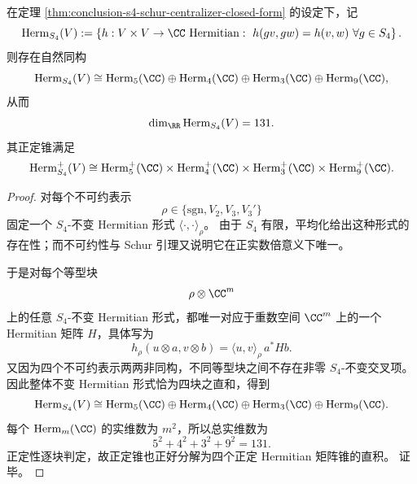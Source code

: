 \begin{proposition}\label{prop:conclusion-s4-invariant-hermitian-cone-product}
在定理 \ref{thm:conclusion-s4-schur-centralizer-closed-form} 的设定下，记
\[
\mathrm{Herm}_{S_4}(V)
:=
\left\{
h:V\times V\to \CC\ \text{Hermitian}:\ 
h(gv,gw)=h(v,w)\ \forall g\in S_4
\right\}.
\]
则存在自然同构
\[
\mathrm{Herm}_{S_4}(V)
\cong
\mathrm{Herm}_5(\CC)\oplus
\mathrm{Herm}_4(\CC)\oplus
\mathrm{Herm}_3(\CC)\oplus
\mathrm{Herm}_9(\CC),
\]
从而
\[
\dim_{\RR}\mathrm{Herm}_{S_4}(V)=131.
\]
其正定锥满足
\[
\mathrm{Herm}_{S_4}^{+}(V)
\cong
\mathrm{Herm}_5^{+}(\CC)\times
\mathrm{Herm}_4^{+}(\CC)\times
\mathrm{Herm}_3^{+}(\CC)\times
\mathrm{Herm}_9^{+}(\CC).
\]
\end{proposition}
\begin{proof}
对每个不可约表示
\[
\rho\in\{\mathrm{sgn},V_2,V_3,V_3'\}
\]
固定一个 \(S_4\)-不变 Hermitian 形式 \(\langle\cdot,\cdot\rangle_\rho\)。
由于 \(S_4\) 有限，平均化给出这种形式的存在性；而不可约性与 Schur 引理又说明它在正实数倍意义下唯一。

于是对每个等型块
\[
\rho\otimes \CC^m
\]
上的任意 \(S_4\)-不变 Hermitian 形式，都唯一对应于重数空间 \(\CC^m\) 上的一个 Hermitian 矩阵 \(H\)，具体写为
\[
h_\rho(u\otimes a,v\otimes b)
=
\langle u,v\rangle_\rho\, a^*Hb.
\]
又因为四个不可约表示两两非同构，不同等型块之间不存在非零 \(S_4\)-不变交叉项。
因此整体不变 Hermitian 形式恰为四块之直和，得到
\[
\mathrm{Herm}_{S_4}(V)
\cong
\mathrm{Herm}_5(\CC)\oplus
\mathrm{Herm}_4(\CC)\oplus
\mathrm{Herm}_3(\CC)\oplus
\mathrm{Herm}_9(\CC).
\]
每个 \(\mathrm{Herm}_m(\CC)\) 的实维数为 \(m^2\)，所以总实维数为
\[
5^2+4^2+3^2+9^2=131.
\]
正定性逐块判定，故正定锥也正好分解为四个正定 Hermitian 矩阵锥的直积。
证毕。
\end{proof}

